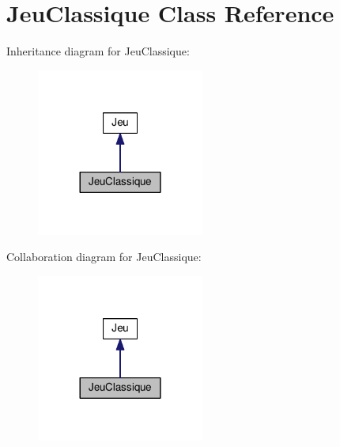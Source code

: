 \hypertarget{classJeuClassique}{}\section{Jeu\+Classique Class Reference}
\label{classJeuClassique}


Inheritance diagram for Jeu\+Classique\+:
\nopagebreak
\begin{figure}[H]
\begin{center}
\leavevmode
\includegraphics[width=156pt]{classJeuClassique__inherit__graph}
\end{center}
\end{figure}


Collaboration diagram for Jeu\+Classique\+:
\nopagebreak
\begin{figure}[H]
\begin{center}
\leavevmode
\includegraphics[width=156pt]{classJeuClassique__coll__graph}
\end{center}
\end{figure}
